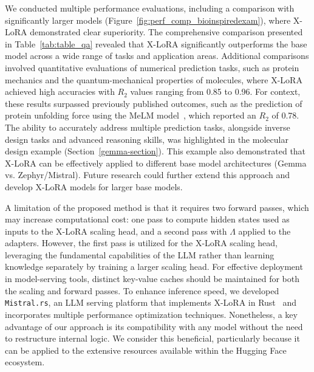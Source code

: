 We conducted multiple performance evaluations, including a comparison with significantly larger models (Figure~\ref{fig:perf_comp_bioinspiredexam}), where X-LoRA demonstrated clear superiority. The comprehensive comparison presented in Table~\ref{tab:table_qa} revealed that X-LoRA significantly outperforms the base model across a wide range of tasks and application areas. Additional comparisons involved quantitative evaluations of numerical prediction tasks, such as protein mechanics and the quantum-mechanical properties of molecules, where X-LoRA achieved high accuracies with $R_2$ values ranging from 0.85 to 0.96. For context, these results surpassed previously published outcomes, such as the prediction of protein unfolding force using the MeLM model~\cite{Buehler2023MeLMProblemsb}, which reported an $R_2$ of 0.78. The ability to accurately address multiple prediction tasks, alongside inverse design tasks and advanced reasoning skills, was highlighted in the molecular design example (Section~\ref{gemma-section}). This example also demonstrated that X-LoRA can be effectively applied to different base model architectures (Gemma vs. Zephyr/Mistral). Future research could further extend this approach and develop X-LoRA models for larger base models.

A limitation of the proposed method is that it requires two forward passes, which may increase computational cost: one pass to compute hidden states used as inputs to the X-LoRA scaling head, and a second pass with $\Lambda$ applied to the adapters. However, the first pass is utilized for the X-LoRA scaling head, leveraging the fundamental capabilities of the LLM rather than learning knowledge separately by training a larger scaling head. For effective deployment in model-serving tools, distinct key-value caches should be maintained for both the scaling and forward passes. To enhance inference speed, we developed \texttt{Mistral.rs}, an LLM serving platform that implements X-LoRA in Rust~\cite{matsakis2014rust} and incorporates multiple performance optimization techniques. Nonetheless, a key advantage of our approach is its compatibility with any model without the need to restructure internal logic. We consider this beneficial, particularly because it can be applied to the extensive resources available within the Hugging Face ecosystem.

